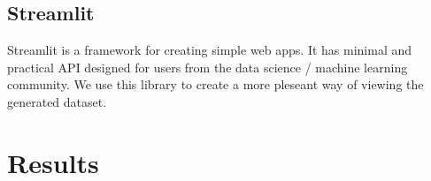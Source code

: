 \subsection{Streamlit}
Streamlit is a framework for creating simple web apps. It has minimal and practical API designed for users from the data science / machine learning community.  We use this library to create a more pleseant way of viewing the generated dataset.




\section{Results}

